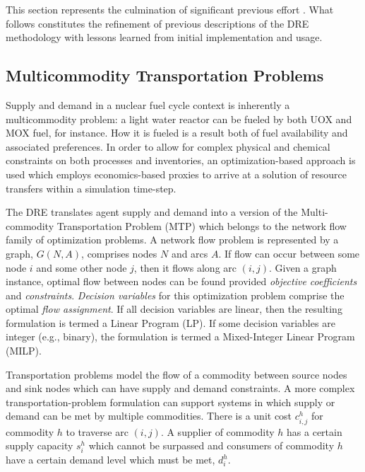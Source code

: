 This section represents the culmination of significant previous effort
\cite{gidden_agent-based_2013, gidden_agent-based_2014,
  gidden_agent-based_slc_2013}. What follows constitutes the refinement of
previous descriptions of the DRE methodology with lessons learned from initial
implementation and usage.

\subsection{Multicommodity Transportation Problems}\label{meth:mtp}

Supply and demand in a nuclear fuel cycle context is inherently a multicommodity
problem: a light water reactor can be fueled by both UOX and MOX fuel, for
instance. How it is fueled is a result both of fuel availability and associated
preferences. In order to allow for complex physical and chemical constraints on
both processes and inventories, an optimization-based approach is used which
employs economics-based proxies to arrive at a solution of resource transfers
within a simulation time-step.

The DRE translates agent supply and demand into a version of the Multi-commodity
Transportation Problem (MTP) \cite{even1975complexity} which belongs to the
network flow family of optimization problems. A network flow problem is
represented by a graph, $G(N, A)$, comprises nodes $N$ and arcs $A$. If flow
can occur between some node $i$ and some other node $j$, then it flows along arc
$(i, j)$. Given a graph instance, optimal flow between nodes can be found
provided \textit{objective coefficients} and
\textit{constraints}. \textit{Decision variables} for this optimization problem
comprise the optimal \textit{flow assignment}. If all decision variables are
linear, then the resulting formulation is termed a Linear Program (LP). If some
decision variables are integer (e.g., binary), the formulation is termed a
Mixed-Integer Linear Program (MILP).

Transportation problems model the flow of a commodity between source nodes and
sink nodes which can have supply and demand constraints. A more complex
transportation-problem formulation can support systems in which supply or demand
can be met by multiple commodities.  There is a unit cost $c_{i,j}^{h}$ for
commodity $h$ to traverse arc $(i,j)$. A supplier of commodity $h$ has a certain
supply capacity $s_i^h$ which cannot be surpassed and consumers of commodity $h$
have a certain demand level which must be met, $d_i^h$.

